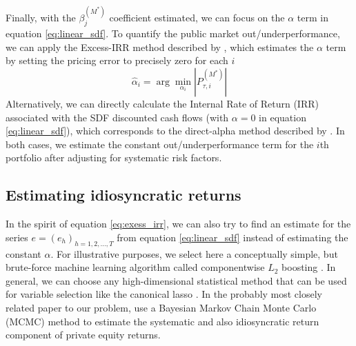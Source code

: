 \documentclass[12pt]{article}
\begin{document}
Finally, with the $\beta_j^{(M^*)}$ coefficient estimated, we can focus on the $\alpha$ term in equation \ref{eq:linear_sdf}.
To quantify the public market out/underperformance, we can apply the Excess-IRR method described by \cite{PG09}, which estimates the $\alpha$ term by setting the pricing error to precisely zero for each $i$
\begin{equation}
	\label{eq:exess_irr}
\hat{\alpha}_i = \arg \min_{\alpha_i} \left| P_{\tau, i}^{(M^*)}  \right|
\end{equation}
Alternatively, we can directly calculate the Internal Rate of Return (IRR) associated with the SDF discounted cash flows (with $\alpha=0$ in equation \ref{eq:linear_sdf}), which corresponds to the direct-alpha method described by \cite{GGS14}.
In both cases, we estimate the constant out/underperformance term for the $i$th portfolio after adjusting for systematic risk factors.

\subsection{Estimating idiosyncratic returns}
\label{sec:error_term_estimation}

In the spirit of equation \ref{eq:exess_irr}, we can also try to find an estimate for the series $e=(e_h)_{h=1,2,\dots,T}$ from equation \ref{eq:linear_sdf} instead of estimating the constant $\alpha$.
For illustrative purposes, we select here a conceptually simple, but brute-force machine learning algorithm called componentwise $L_2$ boosting \citep{B06}.
In general, we can choose any high-dimensional statistical method that can be used for variable selection like the canonical lasso \citep{BG11}.
In the probably most closely related paper to our problem, \cite{ACGP18} use a Bayesian Markov Chain Monte Carlo (MCMC) method to estimate the systematic and also idiosyncratic return component of private equity returns.
\end{document}
